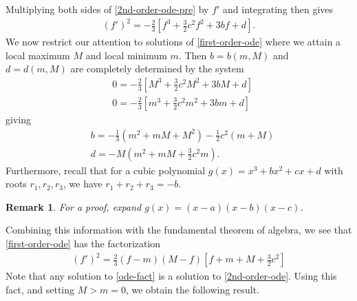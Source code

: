\documentclass[12pt,reqno]{amsart}
\numberwithin{equation}{section}  %
\newtheorem{remark}[theorem]{Remark}
\begin{document}
%
%
Multiplying both sides of \eqref{2nd-order-ode-pre} by $f'$ and integrating then
gives 
%
\begin{equation}
  \label{first-order-ode}
\begin{split}
  (f')^{2} = -\frac{2}{3} \left [ f^{3} + \frac{3}{2} c^{2} f^{2} + 3bf +d
  \right ].
\end{split}
\end{equation}
%
%
We now restrict our attention to solutions of \eqref{first-order-ode} where
we attain a local maximum $M$ and local minimum $m$. Then $b = b(m, M)$ and $d =
d(m, M)$ are 
completely determined by the system
%
%
\begin{equation*}
\begin{split}
  & 0 = -\frac{2}{3} \left [ M^{3} + \frac{3}{2} c^{2} M^{2} + 3bM + d
  \right ]
  \\
  & 0 = -\frac{2}{3} \left [ m^{3} + \frac{3}{2} c^{2} m^{2} + 3bm + d
  \right ]
\end{split}
\end{equation*}
%
giving
%
%
\begin{equation}
  \label{b-val}
\begin{split}
  & b  = -\frac{1}{3}\left( m^{2} + mM + M^{2} \right) - \frac{1}{2}c^{2}\left( m + M
  \right)
  \\
  & d = -M\left( m^{2} + mM + \frac{3}{2}c^{2} m \right).
\end{split}
\end{equation}
%
%
%
Furthermore, recall that for a cubic polynomial $g(x) = x^{3} +bx^{2} +cx +d$
with roots $r_{1}, r_{2}, r_{3}$, we have $r_{1} + r_{2} + r_{3} = -b$.
%
%
\begin{framed}
%
%
\begin{remark}
\label{rem:fact-pf}
For a proof, expand 
$g(x) = (x-a)(x-b)(x-c)$.
\end{remark}
%
%
\end{framed}
%
%
Combining this information with the fundamental theorem of algebra, 
we see that \eqref{first-order-ode} has the factorization
%
%
%
%
\begin{equation}
\begin{split}
  \left ( f'\right )^{2}
  = \frac{2}{3} \left (f-m\right )
  \left( M-f\right )
  \left [ f + m + M + \frac{3}{2}c^{2} \right ]
\end{split}
\label{ode-fact}
\end{equation}
%
Note that any solution to \eqref{ode-fact} is a solution to
\eqref{2nd-order-ode}. Using this fact, and setting $M > m = 0$, we obtain the following result.
\end{document}
